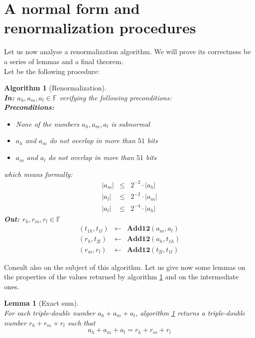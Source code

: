 \documentclass[a4paper,10pt,twoside]{article}
\newtheorem{lemma}[theorem]{Lemma}
\newtheorem{algorithm}[theorem]{Algorithm}
\newcommand{\F}{\ensuremath{\mathbb {F}}}
\newcommand{\hi}{\ensuremath{\mathit{h}}}
\newcommand{\mi}{\ensuremath{\mathit{m}}}
\newcommand{\lo}{\ensuremath{\mathit{l}}}
\newcommand{\mAdd}{\ensuremath{\mathbf{Add12}}}
\begin{document}
\section{A normal form and renormalization procedures}
Let us now analyse a renormalization algorithm. We will prove its
correctness be a series of lemmas and a final theorem. \\
Let be the following procedure:
\begin{algorithm}[Renormalization] \label{renorm}~\\
{\bf In: $a_\hi, a_\mi, a_\lo \in \F$} verifying the following preconditions:\\
{\bf Preconditions: }
\begin{itemize}
\item None of the numbers $a_\hi, a_\mi, a_\lo$ is subnormal
\item $a_\hi$ and $a_\mi$ do not overlap in more than $51$ bits
\item $a_\mi$ and $a_\lo$ do not overlap in more than $51$ bits
\end{itemize}
which means formally:
\begin{eqnarray*}
\left \vert a_\mi \right \vert & \leq & 2^{-2} \cdot \left \vert a_\hi \right \vert \\
\left \vert a_\lo \right \vert & \leq & 2^{-2} \cdot \left \vert a_\mi \right \vert \\
\left \vert a_\lo \right \vert & \leq & 2^{-4} \cdot \left \vert a_\hi \right \vert
\end{eqnarray*}
{\bf Out: $r_\hi, r_\mi, r_\lo \in \F$}
\begin{eqnarray*}
\left(t_{1\hi}, t_{1\lo}\right) & \gets & \mAdd\left(a_\mi,a_\lo\right) \\
\left(r_\hi, t_{2\lo}\right) & \gets & \mAdd\left(a_\hi, t_{1\hi}\right) \\
\left(r_\mi, r_\lo\right) & \gets & \mAdd\left(t_{2\lo}, t_{1\lo}\right)
\end{eqnarray*}
\end{algorithm}
Consult also \cite{Finot-thesis} on the subject of this algorithm.
Let us give now some lemmas on the properties of the values returned by
algorithm \ref{renorm} and on the intermediate ones.
\begin{lemma}[Exact sum] \label{exact} ~\\
For each triple-double number $a_\hi + a_\mi + a_\lo$, algorithm \ref{renorm}
returns a triple-double number $r_\hi + r_\mi + r_\lo$ such that
$$a_\hi + a_\mi + a_\lo = r_\hi + r_\mi + r_\lo$$
\end{lemma}
\end{document}
